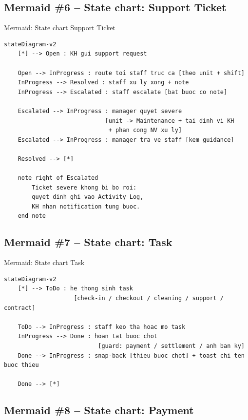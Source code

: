\documentclass[12pt,a4paper]{article}
\renewcommand{\_}{\textunderscore\allowbreak}
\begin{document}
\subsection{Mermaid \#6 -- State chart: Support Ticket}

\begin{mermaidbox}{Mermaid: State chart Support Ticket}
\begin{Verbatim}[fontsize=\small]
%% StorageHub - State chart: vong doi Support Ticket (SR-)
stateDiagram-v2
    [*] --> Open : KH gui support request

    Open --> InProgress : route toi staff truc ca [theo unit + shift]
    InProgress --> Resolved : staff xu ly xong + note
    InProgress --> Escalated : staff escalate [bat buoc co note]

    Escalated --> InProgress : manager quyet severe
                             [unit -> Maintenance + tai dinh vi KH
                              + phan cong NV xu ly]
    Escalated --> InProgress : manager tra ve staff [kem guidance]

    Resolved --> [*]

    note right of Escalated
        Ticket severe khong bi bo roi:
        quyet dinh ghi vao Activity Log,
        KH nhan notification tung buoc.
    end note
\end{Verbatim}
\end{mermaidbox}

\subsection{Mermaid \#7 -- State chart: Task}

\begin{mermaidbox}{Mermaid: State chart Task}
\begin{Verbatim}[fontsize=\small]
%% StorageHub - State chart: vong doi Task (kanban)
stateDiagram-v2
    [*] --> ToDo : he thong sinh task
                    [check-in / checkout / cleaning / support / contract]

    ToDo --> InProgress : staff keo tha hoac mo task
    InProgress --> Done : hoan tat buoc chot
                           [guard: payment / settlement / anh ban ky]
    Done --> InProgress : snap-back [thieu buoc chot] + toast chi ten buoc thieu

    Done --> [*]
\end{Verbatim}
\end{mermaidbox}

\subsection{Mermaid \#8 -- State chart: Payment}
\end{document}
